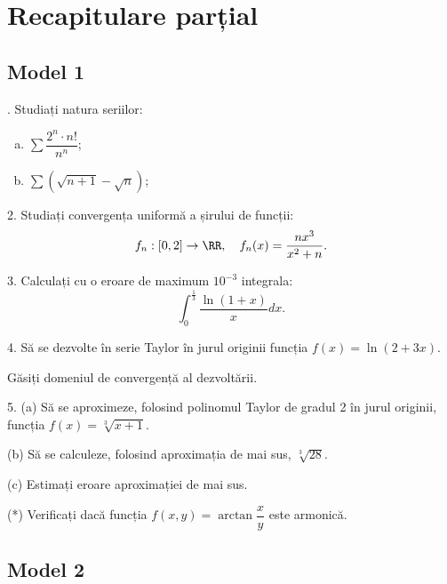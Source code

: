 
\chapter{Recapitulare parțial}

\section{Model 1}

\indent{}. Studiați natura seriilor:
\begin{enumerate}[(a)]
\item $ \sum \dfrac{2^n \cdot n!}{n^n} $;
\item $ \sum (\sqrt{n + 1} - \sqrt{n}) $;
\end{enumerate}

\vspace{0.5cm}

2. Studiați convergența uniformă a șirului de funcții:
\[
  f_n : [0, 2] \to \RR, \quad f_n(x) = \dfrac{nx^3}{x^2 + n}.
\]

\vspace{0.5cm}

3. Calculați cu o eroare de maximum $ 10^{-3} $ integrala:
\[
  \int_0^{\frac{1}{3}} \dfrac{\ln(1 + x)}{x} dx.
\]

\vspace{0.5cm}

4. Să se dezvolte în serie Taylor în jurul originii funcția $ f(x) = \ln(2 + 3x) $.

Găsiți domeniul de convergență al dezvoltării.

\vspace{0.5cm}

5. (a) Să se aproximeze, folosind polinomul Taylor de gradul 2 în jurul originii,
funcția $ f(x) = \sqrt[3]{x + 1} $.

(b) Să se calculeze, folosind aproximația de mai sus, $ \sqrt[3]{28} $.

(c) Estimați eroare aproximației de mai sus.

\vspace{0.5cm}

(*) Verificați dacă funcția $ f(x, y) = \arctan\dfrac{x}{y} $ este armonică.


\section{Model 2}


